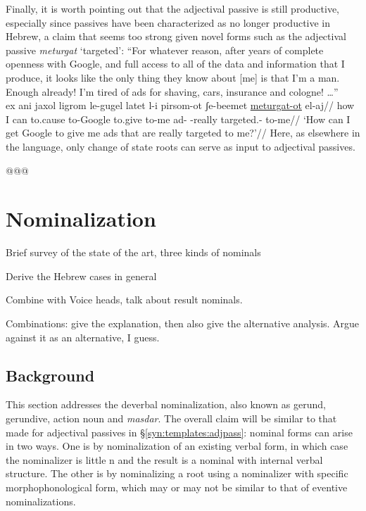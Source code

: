 Finally, it is worth pointing out that {the adjectival passive} is still productive, especially since passives have been characterized as no longer productive in Hebrew, a claim that seems too strong given novel forms such as{ the adjectival passive} \emph{meturgat} `targeted':
\ex ``For whatever reason, after years of complete openness with Google, and full access to all of the data and information that I produce, it looks like the only thing they know about [me] is that I'm a man. Enough already! I'm tired of ads for shaving, cars, insurance and cologne! \dots ''\\
	\begingl
		\gla ex ani jaxol ligrom le-gugel latet l-i pirsom-ot ʃe-beemet \underline{meturgat-ot} el-aj//
		\glb how I can to.cause to-Google to.give to-me ad- -really targeted.- to-me//
		\glft `How can I get Google to give me ads that are really targeted to me?'//
	\endgl
\xe
Here, as elsewhere in the language, only change of state roots can serve as input to adjectival passives.


@@@
\section{Nominalization} \label{passn:n}
Brief survey of the state of the art, three kinds of nominals

Derive the Hebrew cases in general

Combine with Voice heads, talk about result nominals.

Combinations: give the \cite{ahdoutkastner18} explanation, then also give the {\vz} alternative analysis. Argue against it as an alternative, I guess.

	\subsection{Background}

This section addresses the deverbal nominalization, also known as gerund, gerundive, action noun and \emph{masdar}. The overall claim will be similar to that made for adjectival passives in \S\ref{syn:templates:adjpass}: nominal forms can arise in two ways. One is by nominalization of an existing verbal form, in which case the nominalizer is little n and the result is a nominal with internal verbal structure. The other is by nominalizing a root using a nominalizer with specific morphophonological form, which may or may not be similar to that of eventive nominalizations.

